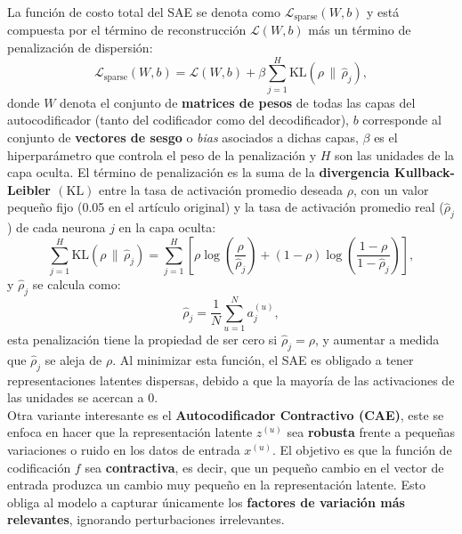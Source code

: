 \documentclass[a4paper,10pt]{book}
\begin{document}
La función de costo total del SAE se denota como $\mathcal{L}_{\text{sparse}}(W,b)$ y está
compuesta por el término de reconstrucción $\mathcal{L}(W,b)$ más un término de penalización de dispersión:
\begin{equation}
	\mathcal{L}_{\text{sparse}}(W,b)
	=
	\mathcal{L}(W,b)
	+
	\beta \sum_{j=1}^{H} \mathrm{KL}(\rho \,\|\, \hat{\rho}_j),
	\label{eq:loss_sae}
\end{equation}
donde $W$ denota el conjunto de \textbf{matrices de pesos} de todas las capas del autocodificador (tanto del codificador como del decodificador), $b$ corresponde al conjunto de \textbf{vectores de sesgo} o \emph{bias} asociados a dichas capas, $\beta$ es el hiperparámetro que controla el peso de la penalización y $H$ son las unidades de la capa oculta. El término de penalización es la suma de la \textbf{divergencia Kullback-Leibler $(\mathrm{KL})$} entre la tasa de activación promedio deseada $\rho$, con un valor pequeño fijo (0.05 en el artículo original) y la tasa de activación promedio real ($\hat{\rho}_j$) de cada neurona $j$ en la capa oculta:
\begin{equation}
	\sum_{j=1}^{H} \text{KL}(\rho \,\|\, \hat{\rho}_j)
	=
	\sum_{j=1}^{H}
	\left[
	\rho \log\left(\frac{\rho}{\hat{\rho}_j}\right)
	+
	(1 - \rho) \log\left(\frac{1-\rho}{1-\hat{\rho}_j}\right)
	\right],
	\label{eq:kullback-leibler}
\end{equation}
y $\hat{\rho}_j$ se calcula como:
\begin{equation}
	\hat{\rho}_j =
	\frac{1}{N} \sum_{u=1}^{N} a_j^{(u)},
	\label{eq:activacion_promedio}
\end{equation}
esta penalización tiene la propiedad de ser cero si $\hat{\rho}_j = \rho$, y aumentar a medida que $\hat{\rho}_j$ se aleja de $\rho$. Al minimizar esta función, el SAE es obligado a tener representaciones latentes dispersas, debido a que la mayoría de las activaciones de las unidades se acercan a 0.\\

Otra variante interesante es el \textbf{Autocodificador Contractivo (CAE)}\cite{rifai2011contracting}, este se enfoca en hacer que la representación latente $z^{(u)}$ sea \textbf{robusta} frente a pequeñas variaciones o ruido en los datos de entrada $x^{(u)}$. El objetivo es que la función de codificación $f$ sea \textbf{contractiva}, es decir, que un pequeño cambio en el vector de entrada produzca un cambio muy pequeño en la representación latente. Esto obliga al modelo a capturar únicamente los \textbf{factores de variación más relevantes}, ignorando perturbaciones irrelevantes.\\
\end{document}
